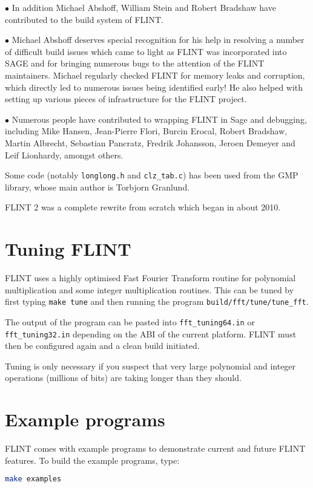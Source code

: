 \documentclass[a4paper,10pt]{book}
\newcommand{\code}{\lstinline}
\begin{document}
$\bullet$ In addition Michael Abshoff, William Stein and Robert Bradshaw have
contributed to the build system of FLINT.

$\bullet$ Michael Abshoff deserves special recognition for his help in
resolving a number of difficult build issues which came to light as FLINT was
incorporated into SAGE and for bringing numerous bugs to the attention of the
FLINT maintainers. Michael regularly checked FLINT for memory leaks and
corruption, which directly led to numerous issues being identified early!
He also helped with setting up various pieces of infrastructure for the FLINT
project.

$\bullet$ Numerous people have contributed to wrapping FLINT in Sage and
debugging, including Mike Hansen, Jean-Pierre Flori, Burcin Erocal, Robert
Bradshaw, Martin Albrecht, Sebastian Pancratz, Fredrik Johansson, Jeroen
Demeyer and Leif Lionhardy, amongst others.

Some code (notably \code{longlong.h} and \code{clz_tab.c}) has been used from
the GMP library, whose main author is Torbjorn Granlund.

FLINT 2 was a complete rewrite from scratch which began in about 2010.

\chapter{Tuning FLINT}

FLINT uses a highly optimised Fast Fourier Transform routine for
polynomial multiplication and some integer multiplication routines. This
can be tuned by first typing \code{make tune} and then running the
program \code{build/fft/tune/tune_fft}.

The output of the program can be pasted into  \code{fft_tuning64.in} or
\code{fft_tuning32.in} depending on the ABI of the current platform. FLINT
must then be configured again and a clean build initiated.

Tuning is only necessary if you suspect that very large polynomial and
integer operations (millions of bits) are taking longer than they should.

\chapter{Example programs}

FLINT comes with example programs to demonstrate current and future FLINT
features.  To build the example programs, type:

\begin{lstlisting}[language=bash]
make examples
\end{lstlisting}
\end{document}
